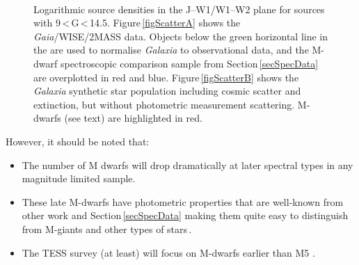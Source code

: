 \begin{figure}[!ht]
    \centering
    \\
    \caption{Logarithmic source densities in the J--W1/W1--W2 plane for sources with 9\,\textless\,G\,\textless\,14.5. Figure\,\ref{figScatterA} shows the {\em Gaia}/WISE/2MASS data. Objects below the green horizontal line in the  are used to normalise {\em Galaxia} to observational data, and the M-dwarf spectroscopic comparison sample from Section\,\ref{secSpecData} are overplotted in red and blue. Figure\,\ref{figScatterB} shows the {\em Galaxia} synthetic star population including cosmic scatter and extinction, but without photometric measurement scattering. M-dwarfs (see text) are highlighted in red.} 
    \label{figScatter}
\end{figure}
However, it should be noted that:
\begin{itemize}
	\item The number of M dwarfs will drop dramatically at later spectral types in any magnitude limited sample.
	\item These late M-dwarfs have photometric properties that are well-known from other work \citep{2002Leggett} and Section\,\ref{secSpecData} making them quite easy to distinguish from M-giants and other types of stars\,\citep{2011Lepine}.
	\item The TESS survey (at least) will focus on M-dwarfs earlier than M5 \citep{2015Ricker}.
\end{itemize}
